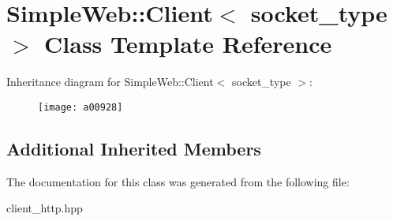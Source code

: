 \hypertarget{a00928}{}\section{Simple\+Web\+:\+:Client$<$ socket\+\_\+type $>$ Class Template Reference}
\label{a00928}
Inheritance diagram for Simple\+Web\+:\+:Client$<$ socket\+\_\+type $>$\+:\begin{figure}[H]
\begin{center}
\leavevmode
\texttt{[image: a00928]}
\end{center}
\end{figure}
\subsection*{Additional Inherited Members}


The documentation for this class was generated from the following file\+:\begin{DoxyCompactItemize}
\item 
client\+\_\+http.\+hpp\end{DoxyCompactItemize}
